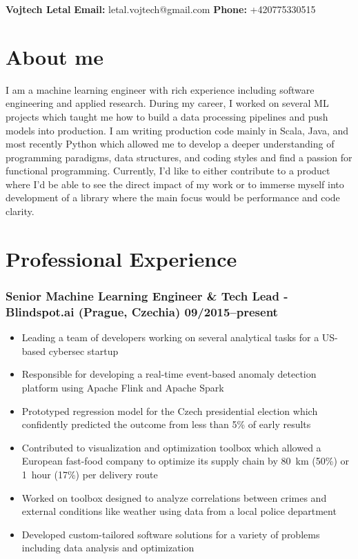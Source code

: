 \documentclass[11pt]{article}
\date{}
\begin{document}
\clearpage
\thispagestyle{empty}
{\center\bfseries\huge Vojtech Letal}
\hfill
{\bf Email:} letal.vojtech@gmail.com
{\bf Phone:} +420775330515

\section*{About me}
I am a machine learning engineer with rich experience including software engineering and applied research.
During my career, I worked on several ML projects which taught me how to build a data processing pipelines and push models into production.
I am writing production code mainly in Scala, Java, and most recently Python which allowed me to develop a deeper understanding of programming paradigms, data structures, and coding styles and find a passion for functional programming.
Currently, I’d like to either contribute to a product where I’d be able to see the direct impact of my work or to immerse myself into development of a library where the main focus would be performance and code clarity.

\section*{Professional Experience}
\subsubsection*{\bf Senior Machine Learning Engineer \& Tech Lead - Blindspot.ai (Prague, Czechia) \hfill 09/2015--present}
	 \begin{itemize}
		\setlength\itemsep{-0.25em}
		\item Leading a team of developers working on several analytical tasks for a US-based cybersec startup
		\item Responsible for developing a real-time event-based anomaly detection platform using Apache Flink and Apache Spark
		\item Prototyped regression model for the Czech presidential election which confidently predicted the outcome from less than 5\% of early results
		\item Contributed to visualization and optimization toolbox which allowed a European fast-food company to optimize its supply chain by 80~km (50\%) or 1~hour (17\%) per delivery route
		\item Worked on toolbox designed to analyze correlations between crimes and external conditions like weather using data from a local police department
		\item Developed custom-tailored software solutions for a variety of problems including data analysis and optimization
	 \end{itemize}
\end{document}
